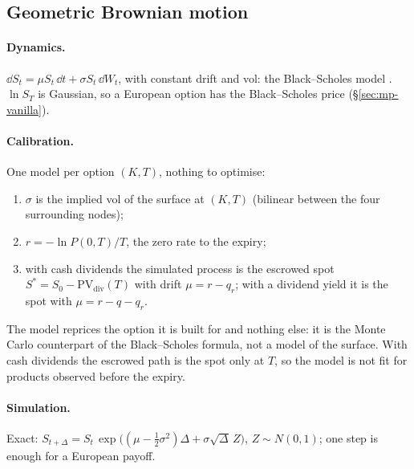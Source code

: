 \subsection{Geometric Brownian motion}\label{sec:mp-gbm}
\paragraph{Dynamics.} $\dd S_t = \mu S_t\,\dd t + \sigma S_t\,\dd W_t$, with constant drift and vol: the Black--Scholes model
\citep{black1973,merton1973}. $\ln S_T$ is Gaussian, so a European option has the Black--Scholes price
(\S\ref{sec:mp-vanilla}).

\paragraph{Calibration.} One model per option $(K, T)$, nothing to optimise:
\begin{enumerate}[nosep]
  \item $\sigma$ is the implied vol of the surface at $(K, T)$ (bilinear between the four surrounding nodes);
  \item $r = -\ln P(0,T)/T$, the zero rate to the expiry;
  \item with cash dividends the simulated process is the escrowed spot $S^* = S_0 - \mathrm{PV}_{\mathrm{div}}(T)$ with drift $\mu = r - q_r$;
        with a dividend yield it is the spot with $\mu = r - q - q_r$.
\end{enumerate}
The model reprices the option it is built for and nothing else: it is the Monte Carlo counterpart of the Black--Scholes
formula, not a model of the surface. With cash dividends the escrowed path is the spot only at $T$, so the model is not
fit for products observed before the expiry.

\paragraph{Simulation.} Exact: $S_{t+\Delta} = S_t\,\exp\big((\mu - \tfrac12\sigma^2)\Delta + \sigma\sqrt\Delta\,Z\big)$, $Z \sim N(0,1)$; one step is
enough for a European payoff.

